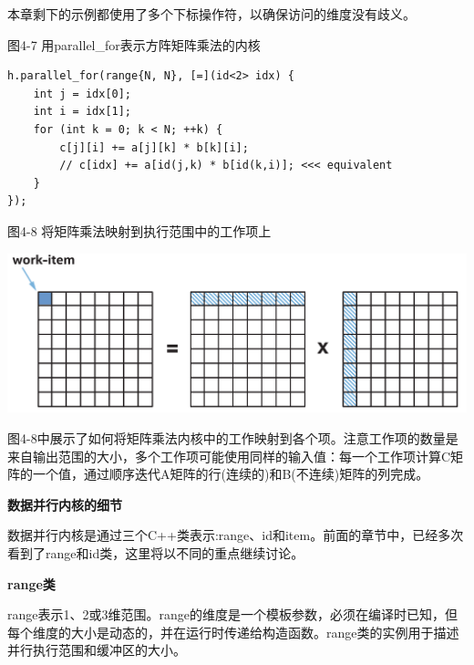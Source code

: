 本章剩下的示例都使用了多个下标操作符，以确保访问的维度没有歧义。\par

\hspace*{\fill} \par %
图4-7 用parallel\_for表示方阵矩阵乘法的内核
\begin{lstlisting}[caption={}]
h.parallel_for(range{N, N}, [=](id<2> idx) {
	int j = idx[0];
	int i = idx[1];
	for (int k = 0; k < N; ++k) {
		c[j][i] += a[j][k] * b[k][i];
		// c[idx] += a[id(j,k) * b[id(k,i)]; <<< equivalent
	}
});
\end{lstlisting}

\hspace*{\fill} \par %
图4-8 将矩阵乘法映射到执行范围中的工作项上
\begin{center}
	\includegraphics[width=1.\textwidth]{content/chapter-4/images/4}
\end{center}

图4-8中展示了如何将矩阵乘法内核中的工作映射到各个项。注意工作项的数量是来自输出范围的大小，多个工作项可能使用同样的输入值：每一个工作项计算C矩阵的一个值，通过顺序迭代A矩阵的行(连续的)和B(不连续)矩阵的列完成。\par

\hspace*{\fill} \par %
\textbf{数据并行内核的细节}

数据并行内核是通过三个C++类表示:range、id和item。前面的章节中，已经多次看到了range和id类，这里将以不同的重点继续讨论。\par

\hspace*{\fill} \par %
\textbf{range类}

range表示1、2或3维范围。range的维度是一个模板参数，必须在编译时已知，但每个维度的大小是动态的，并在运行时传递给构造函数。range类的实例用于描述并行执行范围和缓冲区的大小。\par

